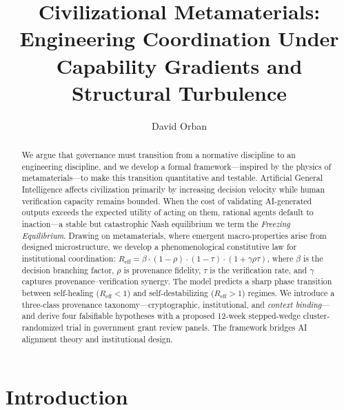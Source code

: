 \documentclass[runningheads]{llncs}
\begin{document}
\title{Civilizational Metamaterials: Engineering Coordination Under Capability Gradients and Structural Turbulence}

\author{David Orban}



\maketitle

\begin{abstract}
We argue that governance must transition from a normative discipline to an engineering discipline, and we develop a formal framework---inspired by the physics of metamaterials---to make this transition quantitative and testable. Artificial General Intelligence affects civilization primarily by increasing decision velocity while human verification capacity remains bounded. When the cost of validating AI-generated outputs exceeds the expected utility of acting on them, rational agents default to inaction---a stable but catastrophic Nash equilibrium we term the \emph{Freezing Equilibrium}. Drawing on metamaterials, where emergent macro-properties arise from designed microstructure, we develop a phenomenological constitutive law for institutional coordination: $R_{\mathrm{eff}} = \beta \cdot (1-\rho) \cdot (1-\tau) \cdot (1+\gamma \rho \tau)$, where $\beta$ is the decision branching factor, $\rho$ is provenance fidelity, $\tau$ is the verification rate, and $\gamma$ captures provenance--verification synergy. The model predicts a sharp phase transition between self-healing ($R_{\mathrm{eff}} < 1$) and self-destabilizing ($R_{\mathrm{eff}} > 1$) regimes. We introduce a three-class provenance taxonomy---cryptographic, institutional, and \emph{context binding}---and derive four falsifiable hypotheses with a proposed 12-week stepped-wedge cluster-randomized trial in government grant review panels. The framework bridges AI alignment theory and institutional design.

\end{abstract}


\section{Introduction}
\label{sec:intro}
\end{document}
